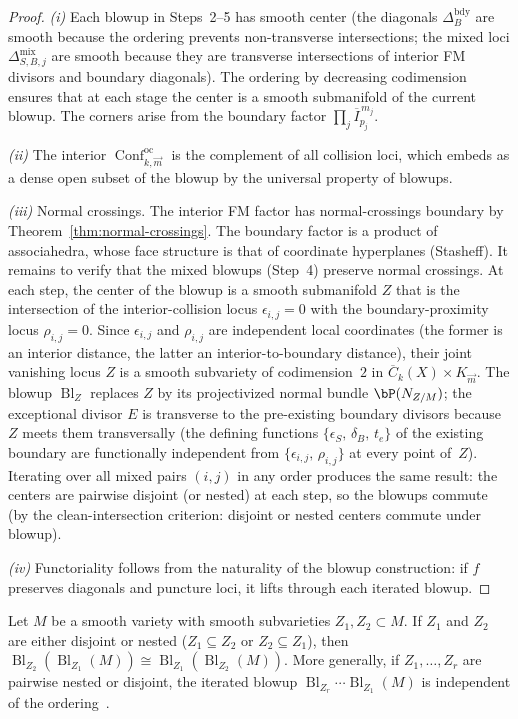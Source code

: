 \begin{proof}
\emph{(i)} Each blowup in Steps~2--5 has smooth center
(the diagonals $\Delta_B^{\mathrm{bdy}}$ are smooth because the
ordering prevents non-transverse intersections; the mixed loci
$\Delta_{S,B,j}^{\mathrm{mix}}$ are smooth because they are
transverse intersections of interior FM divisors and boundary
diagonals).  The ordering by decreasing codimension ensures that
at each stage the center is a smooth submanifold of the current
blowup.  The corners arise from the boundary factor
$\prod_j \overline{I}_{p_j}^{\,m_j}$.

\emph{(ii)} The interior
$\operatorname{Conf}^{\mathrm{oc}}_{k,\vec{m}}$ is the complement
of all collision loci, which embeds as a dense open subset of the
blowup by the universal property of blowups.

\emph{(iii)} Normal crossings.  The interior FM factor has
normal-crossings boundary by Theorem~\ref{thm:normal-crossings}.
The boundary factor is a product of associahedra, whose
face structure is that of coordinate hyperplanes (Stasheff).
It remains to verify that the mixed blowups (Step~4) preserve
normal crossings.  At each step, the center of the blowup is a
smooth submanifold $Z$ that is the intersection of the
interior-collision locus $\epsilon_{i,j} = 0$ with the
boundary-proximity locus $\rho_{i,j} = 0$.  Since $\epsilon_{i,j}$
and $\rho_{i,j}$ are independent local coordinates (the former is
an interior distance, the latter an interior-to-boundary distance),
their joint vanishing locus $Z$ is a smooth subvariety of
codimension~$2$ in $\overline{C}_k(X) \times K_{\vec{m}}$.
The blowup $\operatorname{Bl}_Z$ replaces $Z$ by its projectivized
normal bundle $\bP(N_{Z/M})$; the exceptional divisor $E$ is
transverse to the pre-existing boundary divisors because $Z$
meets them transversally (the defining functions
$\{\epsilon_S,\, \delta_B,\, t_e\}$ of the existing boundary are
functionally independent from $\{\epsilon_{i,j},\, \rho_{i,j}\}$
at every point of~$Z$).  Iterating over all mixed pairs $(i,j)$
in any order produces the same result: the centers are pairwise
disjoint (or nested) at each step, so the blowups commute
(by the clean-intersection criterion: disjoint or nested centers
commute under blowup).

\emph{(iv)} Functoriality follows from the naturality of the
blowup construction: if $f$ preserves diagonals and puncture
loci, it lifts through each iterated blowup.
\end{proof}

\begin{lemma}
\label{lem:nested-blowup-commutativity}
Let $M$ be a smooth variety with smooth subvarieties
$Z_1, Z_2 \subset M$.  If $Z_1$ and $Z_2$ are either
disjoint or nested \textup{(}$Z_1 \subseteq Z_2$ or
$Z_2 \subseteq Z_1$\textup{)}, then
$\operatorname{Bl}_{Z_2}(\operatorname{Bl}_{Z_1}(M))
\cong
\operatorname{Bl}_{Z_1}(\operatorname{Bl}_{Z_2}(M))$.
More generally, if $Z_1, \ldots, Z_r$ are pairwise nested
or disjoint, the iterated blowup
$\operatorname{Bl}_{Z_r} \cdots \operatorname{Bl}_{Z_1}(M)$
is independent of the ordering~\cite{Li01}.
\end{lemma}

